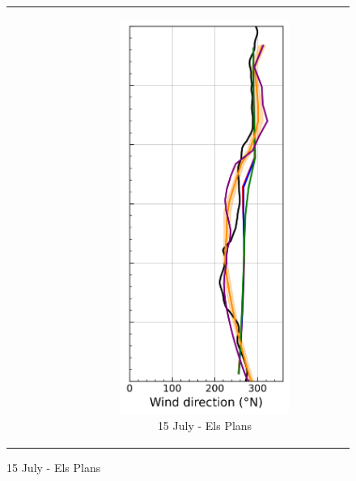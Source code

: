 \begin{figure}[hbtp]
{\begin{tabular}{@{}cccc@{}}
\begin{subfigure}[t]{0.283\textwidth}
        \end{subfigure} &
        \begin{subfigure}[t]{0.283\textwidth}
            \caption{15 July - Els Plans}
            \includegraphics[width=\textwidth]{images/chap6/profiles/profile_elsplans_wind_direction_1507_.png}

\end{subfigure}
\end{tabular}}
\end{figure}
